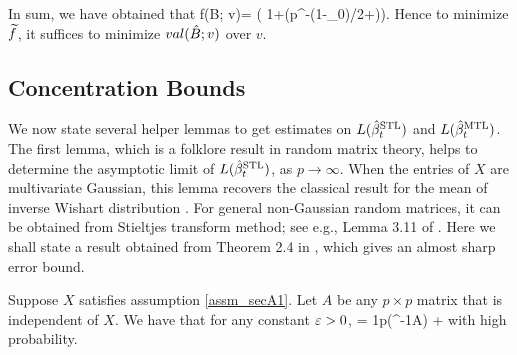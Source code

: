 In sum, we have obtained that 
\be\label{approxvalid}
\wt f(\hat B; v)=  \cdot \left( 1+\OO(p^{-(1-\e_0)/2+\e})\right).
\ee
Hence to minimize $\widetilde f$, it suffices to minimize $val(\hat{B}; v)$ over $v$.

\subsection{Concentration Bounds}\label{app_tool}
We now state several helper lemmas to get estimates on $L(\hat{\beta}_t^{\text{STL}})$ and $L(\hat{\beta}_t^{\text{MTL}})$. The first lemma, which is a folklore result in random matrix theory, helps to determine the asymptotic limit of $L(\hat{\beta}_t^{\text{STL}})$, as $p\to \infty$. When the entries of $X$ are multivariate Gaussian, this lemma recovers the classical result for the mean of inverse Wishart distribution \cite{anderson1958introduction}. For general non-Gaussian random matrices, it can be obtained from Stieltjes transform method; see e.g., Lemma 3.11 of \cite{bai2009spectral}. Here we shall state a result obtained from Theorem 2.4 in \cite{isotropic}, which gives an almost sharp error bound. 
\begin{lemma}\label{lem_minv} 
Suppose $X$ satisfies assumption \ref{assm_secA1}. Let $A$ be any $p\times p$ matrix that is independent of $X$. We have that for any constant ${\varepsilon}>0$,
	\be\label{XXA}   =  \frac1p\tr(\Sigma^{-1}A) + \ee
with high probability.
\end{lemma}


